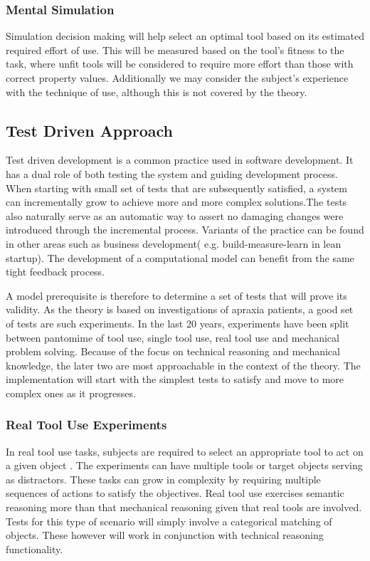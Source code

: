 \documentclass[11]{article}
\begin{document}
\subsubsection*{Mental Simulation}

Simulation decision making will help select an optimal tool based on its estimated required effort of use. This will be measured based on the tool's fitness to the task, where unfit tools will be considered to require more effort than those with correct property values. Additionally we may consider the subject's experience with the technique of use, although this is not covered by the theory.

\subsection*{Test Driven Approach}

Test driven development is a common practice used in software development. It has a dual role of both testing the system and guiding development process. When starting with small set of tests that are subsequently satisfied, a system can incrementally grow to achieve more and more complex solutions.The tests also naturally serve as an automatic way to assert no damaging changes were introduced through the incremental process. Variants of the practice can be found in other areas such as business development( e.g. build-measure-learn in lean startup\cite{rise2011}). The development of a computational model can benefit from the same tight feedback process.

A model prerequisite is therefore to determine a set of tests that will prove its validity. As the theory is based on investigations of apraxia patients, a good set of tests are such experiments. In the last 20 years, experiments have been split between pantomime of tool use, single tool use, real tool use and mechanical problem solving\cite{baumard2014}. Because of the focus on technical reasoning and mechanical knowledge, the later two are most approachable in the context of the theory. The implementation will start with the simplest tests to satisfy and move to more complex ones as it progresses.

\subsubsection*{Real Tool Use Experiments}

In real tool use tasks, subjects are required to select an appropriate tool to act on a given object \cite{baumard2014}. The experiments can have multiple tools or target objects serving as distractors. These tasks can grow in complexity by requiring multiple sequences of actions to satisfy the objectives. Real tool use exercises semantic reasoning more than that mechanical reasoning given that real tools are involved. Tests for this type of scenario will simply involve a categorical matching of objects. These however will work in conjunction with technical reasoning functionality.
\end{document}
